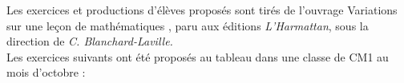 \analyses


\begin{exercice}
Les exercices et productions d'élèves proposés sont tirés de l'ouvrage \og Variations sur une leçon de mathématiques \fg, paru aux éditions {\it L'Harmattan}, sous la direction de {\it C. Blanchard-Laville.} \\ [1mm]
Les exercices suivants ont été proposés au tableau dans une classe de CM1 au mois d'octobre :
\begin{center}
\end{center}


\end{exercice}
